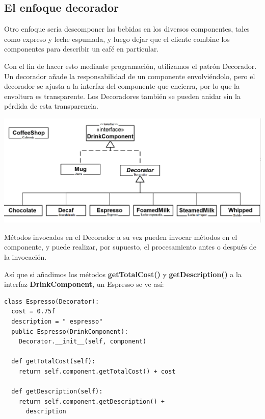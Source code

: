 \documentclass{article}
\begin{document}
\subsection{El enfoque decorador}

Otro enfoque sería descomponer las bebidas en los diversos componentes, tales como expreso y leche espumada, y luego dejar que el cliente combine los componentes para describir un café en particular.    \newline

Con el fin de hacer esto mediante programación, utilizamos el patrón Decorador. Un decorador añade la responsabilidad de un componente envolviéndolo, pero el decorador se ajusta a la interfaz del componente que encierra, por lo que la envoltura es transparente. Los Decoradores también se pueden anidar sin la pérdida de esta transparencia. \newline

\includegraphics[width=\textwidth]{Pagina77}

Métodos invocados en el Decorador a su vez pueden invocar métodos en el componente, y puede realizar, por supuesto, el procesamiento antes o después de la invocación.   \newline

Así que si añadimos los métodos \textbf{getTotalCost()} y \textbf{getDescription()} a la interfaz \textbf{DrinkComponent}, un Espresso se ve así:     \newline

\begin{lstlisting} 
class Espresso(Decorator): 
  cost = 0.75f 
  description = " espresso" 
  public Espresso(DrinkComponent): 
    Decorator.__init__(self, component) 
    
  def getTotalCost(self): 
    return self.component.getTotalCost() + cost 
    
  def getDescription(self): 
    return self.component.getDescription() + 
      description 
\end{lstlisting}
\end{document}
